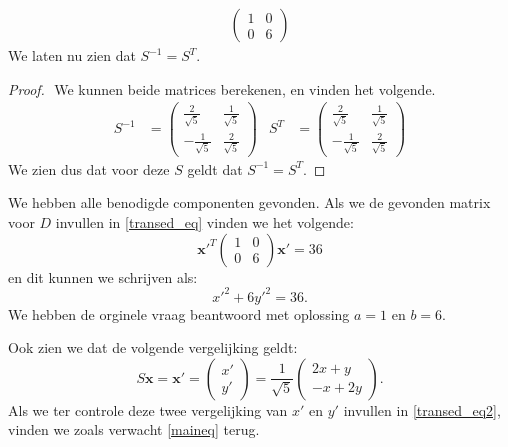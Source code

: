 \documentclass[12pt, dutch, a4paper]{article}
\theoremstyle{definition}
\begin{document}
\begin{enumerate}
\begin{align}
\begin{pmatrix}
            1 & 0 \\
            0 & 6
        \end{pmatrix} 
    \end{align}   
    We laten nu zien dat $S^{-1} = S^T$.
    \begin{proof} $ $ \newline
        We kunnen beide matrices berekenen, en vinden het volgende.
        \begin{align}
            S^{-1} &= 
            \begin{pmatrix}
                \frac{2}{\sqrt{5}} & \frac{1}{\sqrt{5}} \\
                -\frac{1}{\sqrt{5}} & \frac{2}{\sqrt{5}}
            \end{pmatrix} & 
            S^T &= 
            \begin{pmatrix}
                \frac{2}{\sqrt{5}} & \frac{1}{\sqrt{5}} \\
                -\frac{1}{\sqrt{5}} & \frac{2}{\sqrt{5}}
            \end{pmatrix} 
        \end{align}
        We zien dus dat voor deze $S$ geldt dat $S^{-1} = S^T$.

    \end{proof}
    
    We hebben alle benodigde componenten gevonden. Als we de gevonden matrix voor $D$ invullen in \cref{transed_eq} vinden we het volgende:
    \begin{equation}
        \mathbf{x'}^T 
        \begin{pmatrix}
            1 & 0 \\
            0 & 6
        \end{pmatrix} 
        \mathbf{x'} = 36
    \end{equation}
    en dit kunnen we schrijven als:
    \begin{equation} \label{transed_eq2}
        {x'}^2 + 6{y'}^2 = 36.
    \end{equation}
    We hebben de orginele vraag beantwoord met oplossing $a = 1$ en $b = 6$.

    Ook zien we dat de volgende vergelijking geldt: 
    \begin{equation}
        S\mathbf{x} = 
        \mathbf{x'} = 
        \begin{pmatrix}
            x' \\
            y'
        \end{pmatrix}
        = \frac{1}{\sqrt{5}}
        \begin{pmatrix}
            2x + y \\
            -x + 2y
        \end{pmatrix}.
    \end{equation}
    Als we ter controle deze twee vergelijking van $x'$ en $y'$ invullen in \cref{transed_eq2}, vinden we zoals verwacht \cref{maineq} terug.


\end{enumerate}
\end{document}
